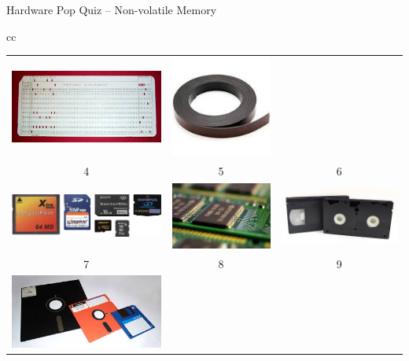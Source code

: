 \documentclass[compress,11pt,xcolor=svgnames,aspectratio=169]{beamer}
\begin{document}
\begin{frame}[t]{Hardware Pop Quiz -- Non-volatile Memory}
\begin{center}
\begin{tabular}{cc}
\begin{tabular}{ccc}
\includegraphics[scale=0.15]{fig/punch-card} &
\includegraphics[scale=0.15]{fig/tape} \\
4 & 5 & 6 \\
\includegraphics[scale=0.15]{fig/card} &
\includegraphics[scale=0.15]{fig/rom} &
\includegraphics[scale=0.15]{fig/vhs} \\
7 & 8 & 9 \\
\includegraphics[scale=0.15]{fig/floppy} &

\end{tabular}
\end{tabular}
\end{center}
\end{frame}
\end{document}
